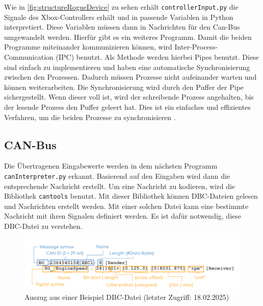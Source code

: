 Wie in \ref{fig:structureRogueDevice} zu sehen erhält \texttt{controllerInput.py} die Signale des Xbox-Controllers 
erhält und in passende Variablen in Python interpretiert. Diese Variablen müssen
dann in Nachrichten für den Can-Bus umgewandelt werden. Hierfür gibt es ein weiteres Programm. Damit die beiden Programme miteinander kommunizieren
können, wird Inter-Process-Communication (IPC) benutzt. Als Methode werden hierbei Pipes benutzt. Diese sind einfach zu implementieren und haben
eine automatische Synchronisierung zwischen den Prozessen. Dadurch müssen Prozesse nicht aufeinander warten und können weiterarbeiten. 
Die Synchronisierung wird durch den Puffer der Pipe sichergestellt. Wenn dieser voll ist, wird der schreibende Prozess angehalten, bis der
lesende Prozess den Puffer geleert hat. Dies ist ein einfaches und effizientes Verfahren, 
um die beiden Prozesse zu synchronisieren \cite{Venkataraman2015}. 

\subsection{CAN-Bus} \label{sec:canBus}
Die Übertragenen Eingabewerte werden in dem nächsten Programm \texttt{canInterpreter.py} erkannt. Basierend auf den
Eingaben wird dann die entsprechende Nachricht erstellt. Um eine Nachricht zu kodieren, wird die Bibliothek \texttt{cantools} benutzt.
Mit dieser Bibliothek können DBC-Dateien gelesen und Nachrichten erstellt werden. Mit einer solchen Datei kann eine
bestimmte Nachricht mit ihren Signalen definiert werden. Es ist dafür notwendig, diese DBC-Datei zu verstehen.
\begin{figure}[H]
    \centering
    \includegraphics[scale=0.2]{images/CAN-DBC-File-Format-Explained-Intro-Basics_2.png}
    \caption{Auszug aus einer Beispiel DBC-Datei \cite{cssElectronics}(letzter Zugriff: 18.02.2025)}
    \label{fig:dbcfile}
\end{figure}

